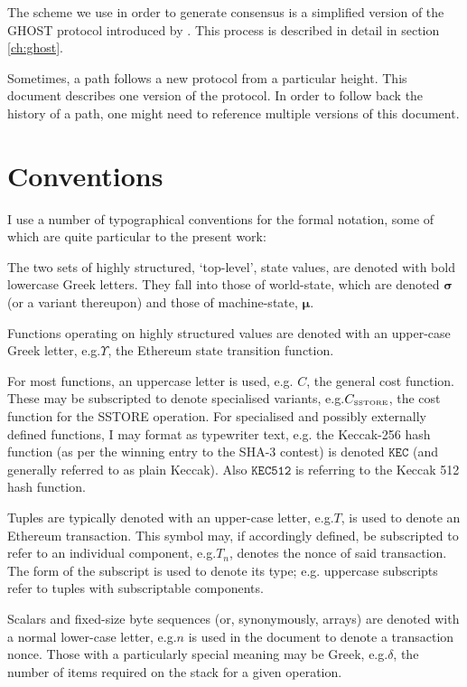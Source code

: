 \documentclass[9pt,oneside]{amsart}
\makeatletter
\newcommand*\eg{e.g.\@\xspace}
\makeatother
\begin{document}
\begin{multicols}{2}
The scheme we use in order to generate consensus is a simplified version of the GHOST protocol introduced by \cite{cryptoeprint:2013:881}. This process is described in detail in section \ref{ch:ghost}.

Sometimes, a path follows a new protocol from a particular height.  This document describes one version of the protocol.  In order to follow back the history of a path, one might need to reference multiple versions of this document.

\section{Conventions}\label{ch:conventions}

I use a number of typographical conventions for the formal notation, some of which are quite particular to the present work:

The two sets of highly structured, `top-level', state values, are denoted with bold lowercase Greek letters. They fall into those of world-state, which are denoted $\boldsymbol{\sigma}$ (or a variant thereupon) and those of machine-state, $\boldsymbol{\mu}$.

Functions operating on highly structured values are denoted with an upper-case Greek letter, \eg $\Upsilon$, the Ethereum state transition function.

For most functions, an uppercase letter is used, e.g. $C$, the general cost function. These may be subscripted to denote specialised variants, \eg $C_\text{\tiny SSTORE}$, the cost function for the {\tiny SSTORE} operation. For specialised and possibly externally defined functions, I may format as typewriter text, \eg the Keccak-256 hash function (as per the winning entry to the SHA-3 contest) is denoted $\texttt{KEC}$ (and generally referred to as plain Keccak). Also $\texttt{KEC512}$ is referring to the Keccak 512 hash function.

Tuples are typically denoted with an upper-case letter, \eg $T$, is used to denote an Ethereum transaction. This symbol may, if accordingly defined, be subscripted to refer to an individual component, \eg $T_n$, denotes the nonce of said transaction. The form of the subscript is used to denote its type; \eg uppercase subscripts refer to tuples with subscriptable components.

Scalars and fixed-size byte sequences (or, synonymously, arrays) are denoted with a normal lower-case letter, \eg $n$ is used in the document to denote a transaction nonce. Those with a particularly special meaning may be Greek, \eg $\delta$, the number of items required on the stack for a given operation.


\end{multicols}
\end{document}
